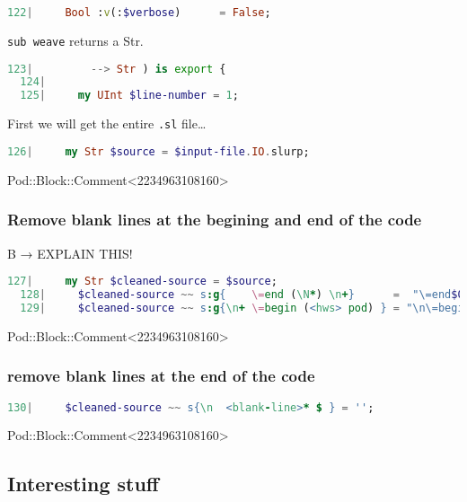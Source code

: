 \documentclass{scrartcl}
\begin{document}
\begin{lstlisting}[language=Raku]
  122|     Bool :v(:$verbose)      = False;

\end{lstlisting}


\texttt{sub weave} returns a Str.

\begin{lstlisting}[language=Raku]
  123|         --> Str ) is export {
  124| 
  125|     my UInt $line-number = 1;

\end{lstlisting}


First we will get the entire \texttt{.sl} file…

\begin{lstlisting}[language=Raku]
  126|     my Str $source = $input-file.IO.slurp;

\end{lstlisting}


Pod::Block::Comment<2234963108160>

\subsubsection{Remove blank lines at the begining and end of the code}

B → EXPLAIN THIS!

\begin{lstlisting}[language=Raku]
  127|     my Str $cleaned-source = $source;
  128|     $cleaned-source ~~ s:g{    \=end (\N*) \n+}      =  "\=end$0\n";
  129|     $cleaned-source ~~ s:g{\n+ \=begin (<hws> pod) } = "\n\=begin$0";

\end{lstlisting}


Pod::Block::Comment<2234963108160>

\subsubsection{remove blank lines at the end of the code}

\begin{lstlisting}[language=Raku]
  130|     $cleaned-source ~~ s{\n  <blank-line>* $ } = '';

\end{lstlisting}


Pod::Block::Comment<2234963108160>

\subsection{Interesting stuff}
\end{document}
